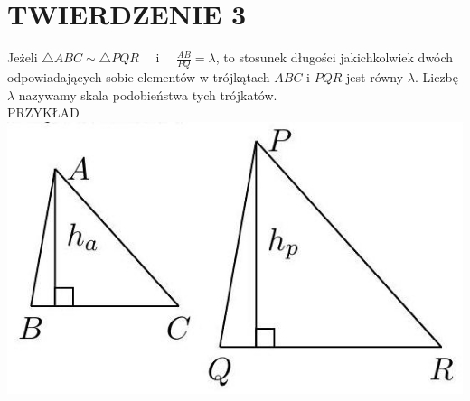 \documentclass[10pt]{article}
\begin{document}
\section*{TWIERDZENIE 3}
Jeżeli \(\triangle A B C \sim \triangle P Q R \quad\) i \(\quad \frac{A B}{P Q}=\lambda\), to stosunek długości jakichkolwiek dwóch odpowiadających sobie elementów w trójkątach \(A B C\) i \(P Q R\) jest równy \(\lambda\). Liczbę \(\lambda\) nazywamy skala podobieństwa tych trójkatów.\\
PRZYKŁAD\\
\includegraphics[max width=\textwidth, center]{2024_11_21_e9b4faa005d5be2cc318g-025}
\end{document}
